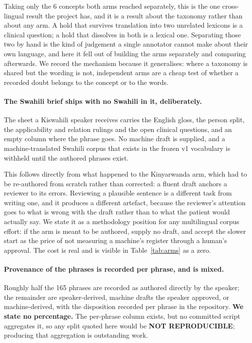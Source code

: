 Taking only the 6 concepts both arms reached separately, this is the one
cross-lingual result the project has, and it is a result about the taxonomy
rather than about any arm. A hold that survives translation into two unrelated
lexicons is a clinical question; a hold that dissolves in both is a lexical
one. Separating those two by hand is the kind of judgement a single
annotator cannot make about their own language, and here it fell out of building
the arms separately and comparing afterwards. We record the mechanism because it
generalises: where a taxonomy is shared but the wording is not, independent arms
are a cheap test of whether a recorded doubt belongs to the concept or to the
words.

\paragraph{The Swahili brief ships with no Swahili in it, deliberately.} The
sheet a Kiswahili speaker receives carries the English gloss, the person split,
the applicability and relation rulings and the open clinical questions, and an
empty column where the phrase goes. No machine draft is supplied, and a
machine-translated Swahili corpus that exists in the frozen v1 vocabulary is
withheld until the authored phrases exist.

This follows directly from what happened to the Kinyarwanda arm, which had to be
re-authored from scratch rather than corrected: a fluent draft anchors a reviewer
to its errors. Reviewing a plausible sentence is a different task from writing
one, and it produces a different artefact, because the reviewer's attention goes
to what is wrong with the draft rather than to what the patient would actually
say. We state it as a methodology position for any multilingual corpus effort:
if the arm is meant to be authored, supply no draft, and accept the slower start
as the price of not measuring a machine's register through a human's approval.
The cost is real and is visible in Table~\ref{tab:arms} as a zero.

\paragraph{Provenance of the phrases is recorded per phrase, and is mixed.}
Roughly half the 165 phrases are recorded as authored directly by the speaker;
the remainder are speaker-derived, machine drafts the speaker approved, or
machine-derived, with the disposition recorded per phrase in the repository.
\textbf{We state no percentage.} The per-phrase column exists, but no committed
script aggregates it, so any split quoted here would be \textbf{NOT
REPRODUCIBLE}; producing that aggregation is outstanding work.

